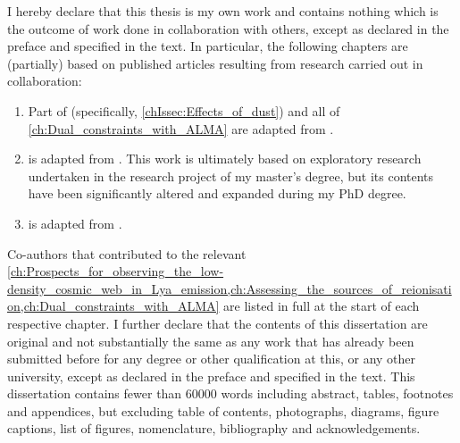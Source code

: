 
\begin{declaration}


    I hereby declare that this thesis is my own work and contains nothing which is the outcome of work done in collaboration with others, except as declared in the preface and specified in the text. In particular, the following chapters are (partially) based on published articles resulting from research carried out in collaboration:
    \begin{enumerate}[label=(\roman*)]
        \item Part of  (specifically, \cref{chIssec:Effects_of_dust}) and all of \cref{ch:Dual_constraints_with_ALMA} are adapted from \citet{2022MNRAS.515.1751W}.
        \item {} is adapted from \citet{2021A&A...650A..98W}. This work is ultimately based on exploratory research undertaken in the research project of my master's degree, but its contents have been significantly altered and expanded during my PhD degree.
        \item {} is adapted from \citet{2021MNRAS.508.1686W}.
    \end{enumerate}
    
    \noindent Co-authors that contributed to the relevant \cref{ch:Prospects_for_observing_the_low-density_cosmic_web_in_Lya_emission,ch:Assessing_the_sources_of_reionisation,ch:Dual_constraints_with_ALMA} are listed in full at the start of each respective chapter. I further declare that the contents of this dissertation are original and not substantially the same as any work that has already been submitted before for any degree or other qualification at this, or any other university, except as declared in the preface and specified in the text. This dissertation contains fewer than \num{60000} words including abstract, tables, footnotes and appendices, but excluding table of contents, photographs, diagrams, figure captions, list of figures, nomenclature, bibliography and acknowledgements.
    

\end{declaration}

